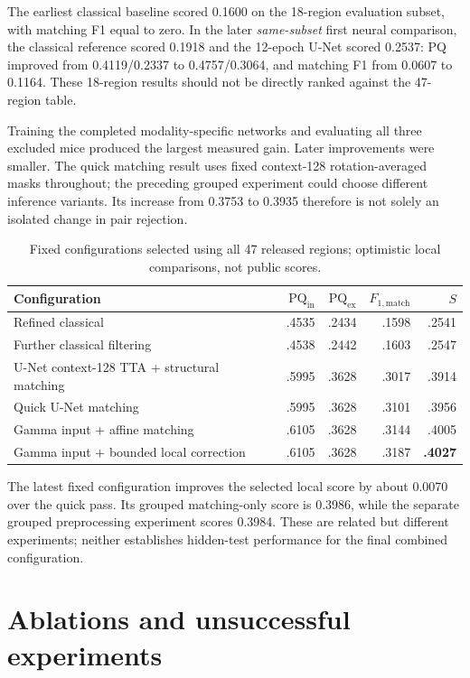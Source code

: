 \documentclass[11pt]{article}
\newcommand{\PQ}{\mathrm{PQ}}
\newcommand{\Fone}{F_{1,\mathrm{match}}}
\begin{document}
The earliest classical baseline scored 0.1600 on the 18-region evaluation subset, with matching F1 equal to zero. In the later \emph{same-subset} first neural comparison, the classical reference scored 0.1918 and the 12-epoch U-Net scored 0.2537: PQ improved from 0.4119/0.2337 to 0.4757/0.3064, and matching F1 from 0.0607 to 0.1164. These 18-region results should not be directly ranked against the 47-region table.

Training the completed modality-specific networks and evaluating all three excluded mice produced the largest measured gain. Later improvements were smaller. The quick matching result uses fixed context-128 rotation-averaged masks throughout; the preceding grouped experiment could choose different inference variants. Its increase from 0.3753 to 0.3935 therefore is not solely an isolated change in pair rejection.

\begin{table}[htbp]
\centering\small
\caption{Fixed configurations selected using all 47 released regions; optimistic local comparisons, not public scores.}
\label{tab:selected}
\begin{tabularx}{\linewidth}{@{}Xrrrr@{}}
\toprule
Configuration & $\PQ_{\mathrm{in}}$ & $\PQ_{\mathrm{ex}}$ & $\Fone$ & $S$\\
\midrule
Refined classical & .4535 & .2434 & .1598 & .2541\\
Further classical filtering & .4538 & .2442 & .1603 & .2547\\
U-Net context-128 TTA + structural matching & .5995 & .3628 & .3017 & .3914\\
Quick U-Net matching & .5995 & .3628 & .3101 & .3956\\
Gamma input + affine matching & .6105 & .3628 & .3144 & .4005\\
Gamma input + bounded local correction & .6105 & .3628 & .3187 & \textbf{.4027}\\
\bottomrule
\end{tabularx}
\end{table}

The latest fixed configuration improves the selected local score by about 0.0070 over the quick pass. Its grouped matching-only score is 0.3986, while the separate grouped preprocessing experiment scores 0.3984. These are related but different experiments; neither establishes hidden-test performance for the final combined configuration.

\section{Ablations and unsuccessful experiments}
\end{document}
